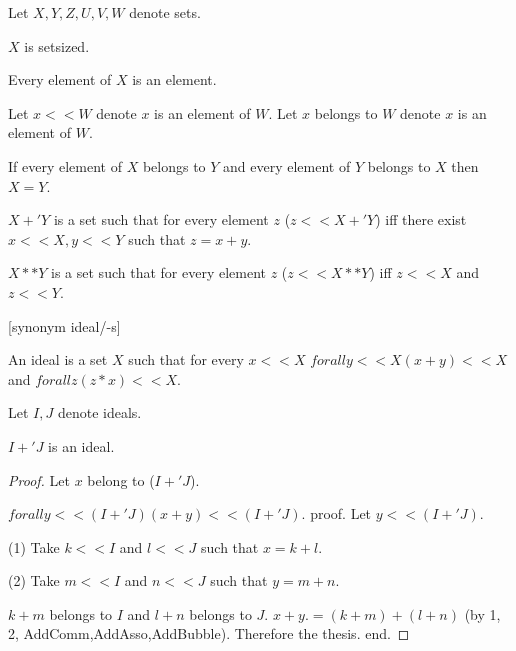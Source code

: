 \documentclass{article}
\begin{document}
\begin{forthel}
    Let $X,Y,Z,U,V,W$ denote sets.

    \begin{axiom}
      $X$ is setsized.
    \end{axiom}

    \begin{axiom}
      Every element of $X$ is an element.
    \end{axiom}

    Let $x << W$ denote $x$ is an element of $W$.
    Let $x$ belongs to $W$ denote $x$ is an element of $W$.

    \begin{axiom}[SetEq]
      If every element of $X$ belongs to $Y$ and every element of $Y$ belongs to $X$ then $X = Y$.
    \end{axiom}

    \begin{definition}[DefSum]
      $X +' Y$ is a set such that for every element $z$ ($z << X +' Y$) iff there exist $x << X, y << Y$ such that $z = x + y$.
    \end{definition}

    \begin{definition}[DefSInt]
      $X ** Y$ is a set such that for every element $z$ ($z << X ** Y$) iff $z << X$ and $z << Y$.
    \end{definition}

    [synonym ideal/-s]

    \begin{definition}[DefIdeal]
      An ideal is a set $X$ such that for every $x << X$
        $forall y << X (x + y) << X$ and
        $forall z (z * x) << X$.
    \end{definition}

    Let $I,J$ denote ideals.

    \begin{lemma}[IdeSum]
      $I +' J$ is an ideal.
    \end{lemma}
    \begin{proof}
      Let $x$ belong to ($I +' J$).

      $forall y << (I +' J) (x + y) << (I +' J)$.
      proof.
        Let $y << (I +' J)$.

        (1) Take $k << I$ and $l << J$ such that $x = k + l$.

        (2) Take $m << I$ and $n << J$ such that $y = m + n$.

        $k + m$ belongs to $I$ and $l + n$ belongs to $J$. $x + y .= (k + m) + (l + n)$ (by 1, 2, AddComm,AddAsso,AddBubble). Therefore the thesis.
      end.


\end{proof}
\end{forthel}
\end{document}
